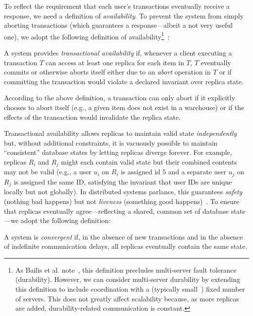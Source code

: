  To reflect the requirement that each user's
transactions eventually receive a response, we need a definition of
\textit{availability}. To prevent the system from simply aborting
transactions (which guarantees a response---albeit a not very useful
one), we adopt the following definition of
availability\footnote{As Bailis et
  al. note~\cite{hat-vldb}, this definition precludes multi-server
  fault tolerance (durability). However, we can consider multi-server
  durability by extending this definition to include coordination with
  a (typically small~\cite{bigtable,spanner,dynamo}) fixed number of
  servers. This does not greatly affect scalability because, as more
  replicas are added, durability-related communication is constant.}~\cite{hat-vldb}:

\begin{definition} 
A system provides \textit{transactional availability} if, whenever a
client executing a transaction $T$ can access at least one replica for
each item in $T$, $T$ eventually commits or otherwise aborts itself
either due to an \textit{abort} operation in $T$ or if committing the
transaction would violate a declared invariant over replica state.
\end{definition}

According to the above definition, a transaction can only abort if it
explicitly chooses to abort itself (e.g., a given item does not exist
in a warehouse) or if the effects of the transaction would invalidate
the replica state.

 Transactional availability allows replicas to
maintain valid state \textit{independently} but, without additional
constraints, it is vacuously possible to maintain ``consistent''
database states by letting replicas diverge forever. For example,
replicas $R_i$ and $R_j$ might each contain valid state but their
combined contents may not be valid (e.g., a user $u_i$ on $R_i$ is
assigned id $5$ and a separate user $u_j$ on $R_j$ is assigned the
same ID, satisfying the invariant that user IDs are unique locally but
not globally). In distributed systems parlance, this guarantees
\textit{safety} (nothing bad happens) but not \textit{liveness}
(something good happens)~\cite{lamport-safety}. To ensure that
replicas eventually agree---reflecting a shared, common set of
database state---we adopt the following definition:

\begin{definition}A system is \textit{convergent} if, in the
absence of new transactions and in the absence of indefinite
communication delays, all replicas eventually contain the same state.
\end{definition}

